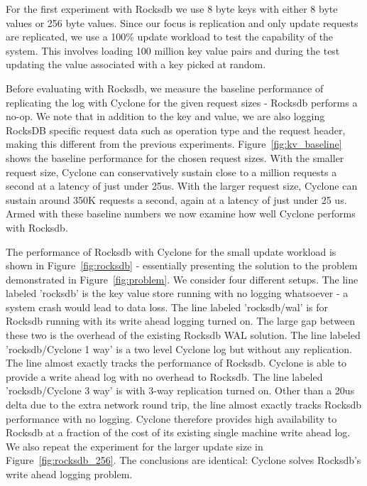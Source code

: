 \documentclass[twocolumn]{article}
\begin{document}
For the first experiment with Rocksdb we use 8 byte keys with either
8 byte values or 256 byte values.  Since our
focus is replication and only update requests are replicated, we use a 100\%
update workload to test the capability of the system. This involves loading 100
million key value pairs and during the test updating the value associated with a
key picked at random.

Before evaluating with Rocksdb, we measure the baseline performance of
replicating the log with Cyclone for the given request sizes - Rocksdb performs
a no-op. We note that in addition to the key and value, we are also logging
RocksDB specific request data such as operation type and the request header,
making this different from the previous experiments.
Figure~\ref{fig:kv_baseline} shows the baseline performance for the chosen
request sizes. With the smaller request size, Cyclone can conservatively sustain
close to a million requests a second at a latency of just under 25us. With the
larger request size, Cyclone can sustain around 350K requests a second, again at
a latency of just under 25 us. Armed with these baseline numbers we now examine
how well Cyclone performs with Rocksdb.

The performance of Rocksdb with Cyclone for the small update workload is shown
in Figure~\ref{fig:rocksdb} - essentially presenting the solution to the problem
demonstrated in Figure~\ref{fig:problem}.  We consider four different
setups. The line labeled 'rocksdb' is the key value store running with no
logging whatsoever - a system crash would lead to data loss. The line labeled
'rocksdb/wal' is for Rocksdb running with its write ahead logging turned on. The
large gap between these two is the overhead of the existing Rocksdb WAL
solution. The line labeled 'rocksdb/Cyclone 1 way' is a two level Cyclone log
but without any replication. The line almost exactly tracks the performance of
Rocksdb. Cyclone is able to provide a write ahead log with no overhead to
Rocksdb. The line labeled 'rocksdb/Cyclone 3 way' is with 3-way replication
turned on. Other than a 20us delta due to the extra network round trip, the line
almost exactly tracks Rocksdb performance with no logging. Cyclone therefore
provides high availability to Rocksdb at a fraction of the cost of its existing
single machine write ahead log. We also repeat the experiment for the larger
update size in Figure~\ref{fig:rocksdb_256}. The conclusions are identical:
Cyclone solves Rocksdb's write ahead logging problem.
\end{document}
